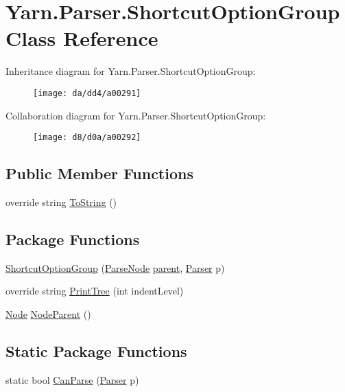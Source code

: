 \hypertarget{a00071}{\section{Yarn.\-Parser.\-Shortcut\-Option\-Group Class Reference}
\label{a00071}
}


Inheritance diagram for Yarn.\-Parser.\-Shortcut\-Option\-Group\-:
\nopagebreak
\begin{figure}[H]
\begin{center}
\leavevmode
\texttt{[image: da/dd4/a00291]}
\end{center}
\end{figure}


Collaboration diagram for Yarn.\-Parser.\-Shortcut\-Option\-Group\-:
\nopagebreak
\begin{figure}[H]
\begin{center}
\leavevmode
\texttt{[image: d8/d0a/a00292]}
\end{center}
\end{figure}
\subsection*{Public Member Functions}
\begin{DoxyCompactItemize}
\item 
override string \hyperlink{a00063_a18c67cb16090d0889bb9d6c8c6c565f8}{To\-String} ()
\end{DoxyCompactItemize}
\subsection*{Package Functions}
\begin{DoxyCompactItemize}
\item 
\hyperlink{a00071_aa4ee47826640ad8dff651603c940c7f4}{Shortcut\-Option\-Group} (\hyperlink{a00063}{Parse\-Node} \hyperlink{a00063_af313a82103fcc2ff5a177dbb06b92f7b}{parent}, \hyperlink{a00064}{Parser} p)
\item 
override string \hyperlink{a00071_a7b60f85e46b8767db81177ec40e83104}{Print\-Tree} (int indent\-Level)
\item 
\hyperlink{a00054}{Node} \hyperlink{a00063_a580e520a29444fc23ac3660cbe514a09}{Node\-Parent} ()
\end{DoxyCompactItemize}
\subsection*{Static Package Functions}
\begin{DoxyCompactItemize}
\item 
static bool \hyperlink{a00071_a906962aae2ecb11535f34249a34703f8}{Can\-Parse} (\hyperlink{a00064}{Parser} p)
\end{DoxyCompactItemize}
